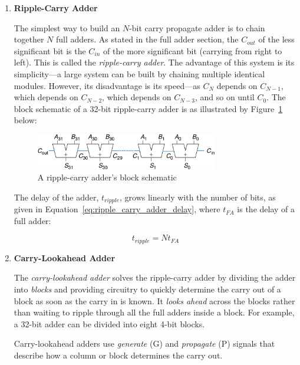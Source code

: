 \documentclass[12pt]{article}
\numberwithin{figure}{subsection}
\numberwithin{table}{subsection}
\numberwithin{equation}{subsection}
\begin{document}
\begin{enumerate}
\begin{enumerate}
    \item \textbf{Ripple-Carry Adder}

    The simplest way to build an $N$-bit carry propagate adder is to chain together $N$ full adders. As stated in the full adder section, the $C_{out}$ of the less significant bit is the $C_{in}$ of the more significant bit (carrying from right to left). This is called the \textit{ripple-carry adder}. The advantage of this system is its simplicity---a large system can be built by chaining multiple identical modules. However, its disadvantage is its speed---as $C_N$ depends on $C_{N - 1}$, which depends on $C_{N - 2}$, which depends on $C_{N - 3}$, and so on until $C_0$. The block schematic of a 32-bit ripple-carry adder is as illustrated by Figure~\ref{fig:ripple_carry_adder} below:

    \begin{figure}[ht]
      \centering
      \includegraphics[width=0.75\textwidth]{ripple_carry_adder.png}
      \caption{A ripple-carry adder's block schematic}
      \label{fig:ripple_carry_adder}
    \end{figure}

    The delay of the adder, $t_{ripple}$, grows linearly with the number of bits, as given in Equation~\ref{eq:ripple_carry_adder_delay}, where $t_{FA}$ is the delay of a full adder:

    \begin{equation} \label{eq:ripple_carry_adder_delay}
      t_{ripple} = N t_{FA}
    \end{equation}

    \item \textbf{Carry-Lookahead Adder}

    The \textit{carry-lookahead adder} solves the ripple-carry adder by dividing the adder into \textit{blocks} and providing circuitry to quickly determine the carry out of a block as soon as the carry in is known. It \textit{looks ahead} across the blocks rather than waiting to ripple through all the full adders inside a block. For example, a 32-bit adder can be divided into eight 4-bit blocks.

    Carry-lookahead adders use \textit{generate} (G) and \textit{propagate} (P) signals that describe how a column or block determines the carry out.


\end{enumerate}
\end{enumerate}
\end{document}
